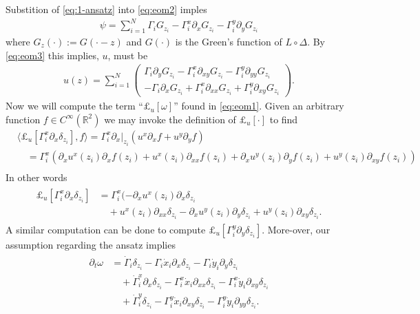 \documentclass[12pt]{amsart}
\begin{document}
Substition of \eqref{eq:1-ansatz} into \eqref{eq:eom2} imples
\begin{align*}
  \psi = \sum_{i=1}^N \Gamma_i G_{z_i} - \Gamma^x_i \partial_xG_{z_i}
  - \Gamma^y_i \partial_yG_{z_i}
\end{align*}
where $G_{z}(\cdot) := G( \cdot - z)$ and  $G(\cdot)$ is the Green's function of $L \circ \Delta$.
By \eqref{eq:eom3} this implies, $u$, must be
\begin{align}
  u(z) = \sum_{i=1}^N \begin{pmatrix}
    \Gamma_i \partial_y G_{z_i} - \Gamma^x_i \partial_{xy}G_{z_i}
   - \Gamma^y_i \partial_{yy}G_{z_i} \\
    -\Gamma_i \partial_xG_{z_i} + \Gamma^x_i \partial_{xx}G_{z_i}
    +\Gamma^y_i \partial_{xy}G_{z_i}
  \end{pmatrix}. \label{eq:1-u}
\end{align}
Now we will compute the term ``$\pounds_u[\omega]$'' found in \eqref{eq:eom1}.
Given an arbitrary function $f \in C^\infty(\mathbb{R}^2)$ we may invoke the definition of $\pounds_u[\cdot]$ to find
\begin{align*}
  &\langle \pounds_u[ \Gamma^x_i \partial_x \delta_{z_i} ] , f \rangle = \Gamma^x_i \partial_x|_{z_i} (u^x \partial_x f + u^y \partial_y f) \\
 &\quad = \Gamma_i^x ( \partial_x u^x(z_i) \partial_xf(z_i) + u^x(z_i) \partial_{xx}f(z_i) 
 + \partial_x u^y(z_i) \partial_yf(z_i) + u^y(z_i) \partial_{xy} f(z_i) )\\
\end{align*}
In other words
\begin{align}
\begin{aligned}
  \pounds_u[\Gamma_i^x \partial_x\delta_{z_i}] &=  \Gamma_i^x ( -\partial_xu^x(z_i) \partial_x \delta_{z_i} \\
  &\quad+ u^x(z_i) \partial_{xx} \delta_{z_i}
  - \partial_x u^y(z_i) \partial_y \delta_{z_i}
  + u^y(z_i) \partial_{xy} \delta_{z_i}.
  \end{aligned}\label{eq:1-Lie}
\end{align}
A similar computation can be done to compute $\pounds_u[\Gamma^y_i \partial_y \delta_{z_i}]$.
More-over, our assumption regarding the ansatz implies
\begin{align}
\begin{aligned}
\partial_t \omega &= \dot{\Gamma}_i \delta_{z_i} - \Gamma_i \dot{x}_i \partial_x \delta_{z_i} - \Gamma_i \dot{y}_i \partial_y \delta_{z_i}\\
&\quad+\dot{\Gamma}_i^x \partial_x \delta_{z_i} - \Gamma_i^x \dot{x}_i \partial_{xx} \delta_{z_i} - \Gamma^x_i \dot{y}_i \partial_{xy} \delta_{z_i}\\
&\quad+\dot{\Gamma}^y_i \delta_{z_i} - \Gamma_i^y \dot{x}_i \partial_{xy} \delta_{z_i} - \Gamma^y_i \dot{y}_i \partial_{yy} \delta_{z_i}.
\end{aligned} \label{eq:1-time_derivative}
\end{align}
\end{document}
